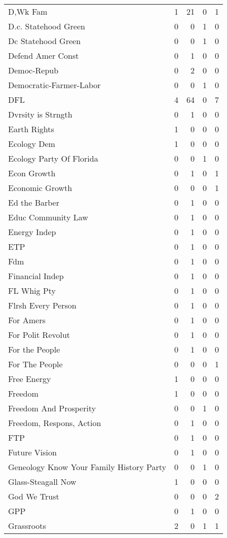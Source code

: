 \begin{supertabular}{lrrrr}
D,Wk Fam & 1 & 21 & 0 & 1\\
D.c. Statehood Green & 0 & 0 & 1 & 0\\
Dc Statehood Green & 0 & 0 & 1 & 0\\
Defend Amer Const & 0 & 1 & 0 & 0\\
Democ-Repub & 0 & 2 & 0 & 0\\
Democratic-Farmer-Labor & 0 & 0 & 1 & 0\\
DFL & 4 & 64 & 0 & 7\\
Dvrsity is Strngth & 0 & 1 & 0 & 0\\
Earth Rights & 1 & 0 & 0 & 0\\
Ecology Dem & 1 & 0 & 0 & 0\\
Ecology Party Of Florida & 0 & 0 & 1 & 0\\
Econ Growth & 0 & 1 & 0 & 1\\
Economic Growth & 0 & 0 & 0 & 1\\
Ed the Barber & 0 & 1 & 0 & 0\\
Educ Community Law & 0 & 1 & 0 & 0\\
Energy Indep & 0 & 1 & 0 & 0\\
ETP & 0 & 1 & 0 & 0\\
Fdm & 0 & 1 & 0 & 0\\
Financial Indep & 0 & 1 & 0 & 0\\
FL Whig Pty & 0 & 1 & 0 & 0\\
Flrsh Every Person & 0 & 1 & 0 & 0\\
For Amers & 0 & 1 & 0 & 0\\
For Polit Revolut & 0 & 1 & 0 & 0\\
For the People & 0 & 1 & 0 & 0\\
For The People & 0 & 0 & 0 & 1\\
Free Energy & 1 & 0 & 0 & 0\\
Freedom & 1 & 0 & 0 & 0\\
Freedom And Prosperity & 0 & 0 & 1 & 0\\
Freedom, Respons, Action & 0 & 1 & 0 & 0\\
FTP & 0 & 1 & 0 & 0\\
Future Vision & 0 & 1 & 0 & 0\\
Geneology Know Your Family History Party & 0 & 0 & 1 & 0\\
Glass-Steagall Now & 1 & 0 & 0 & 0\\
God We Trust & 0 & 0 & 0 & 2\\
GPP & 0 & 1 & 0 & 0\\
Grassroots & 2 & 0 & 1 & 1\\

\end{supertabular}
